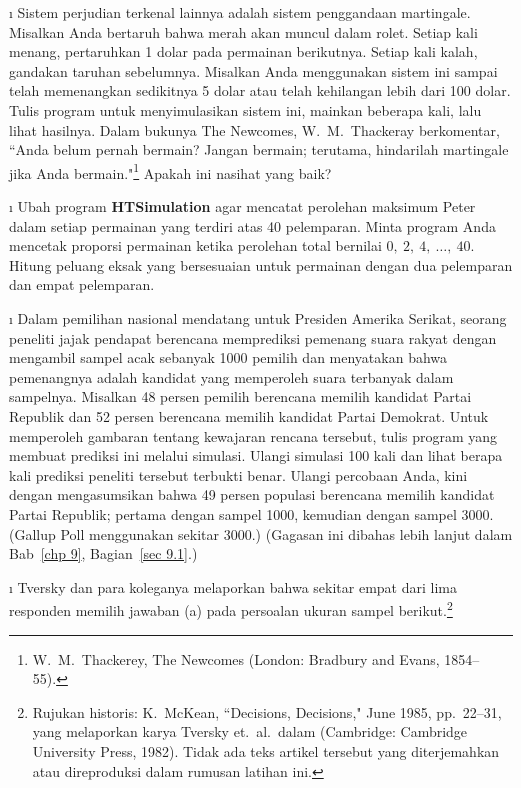 \begin{LJSItem}
\i\label{exer 1.1.10} Sistem perjudian terkenal lainnya adalah \emx
{sistem penggandaan martingale}.  
Misalkan Anda bertaruh bahwa merah akan muncul
dalam rolet.  Setiap kali menang, pertaruhkan 1 dolar pada permainan berikutnya.  Setiap kali
kalah,
gandakan taruhan sebelumnya.  Misalkan Anda menggunakan sistem ini sampai telah memenangkan sedikitnya 5
dolar atau telah kehilangan lebih dari 100 dolar.  Tulis program untuk menyimulasikan
sistem ini, mainkan beberapa kali, lalu lihat hasilnya.  Dalam bukunya
\emx
{The Newcomes,} W.~M.~Thackeray berkomentar, 
``Anda belum pernah bermain?  Jangan
bermain; terutama, hindarilah martingale jika Anda bermain."\footnote{W.~M.~Thackerey, \emx
{The
Newcomes} (London: Bradbury and Evans, 1854--55).}  Apakah ini nasihat yang baik?

\i\label{exer 1.1.11} Ubah program {\bf HTSimulation} agar
mencatat
perolehan maksimum Peter dalam setiap permainan yang terdiri atas 40 pelemparan.  Minta program Anda
mencetak
proporsi permainan ketika perolehan total bernilai $0,\ 2,\ 
4,\ \dots,\ 40$.  Hitung peluang eksak yang bersesuaian untuk permainan dengan
dua
pelemparan dan empat pelemparan.

\i\label{exer 1.1.12} 
Dalam pemilihan nasional mendatang untuk Presiden Amerika Serikat, seorang
peneliti jajak pendapat berencana memprediksi pemenang suara rakyat dengan mengambil
sampel acak
sebanyak 1000 pemilih dan menyatakan bahwa pemenangnya adalah kandidat yang memperoleh
suara terbanyak
dalam sampelnya. Misalkan 48 persen pemilih berencana memilih
kandidat
Partai Republik dan 52 persen berencana memilih kandidat Partai
Demokrat.  
Untuk memperoleh gambaran tentang kewajaran rencana tersebut, tulis program yang membuat
prediksi ini
melalui simulasi.  Ulangi simulasi 100 kali dan lihat berapa kali prediksi peneliti tersebut
terbukti benar.  Ulangi percobaan Anda, kini dengan mengasumsikan bahwa 49 persen
populasi berencana memilih kandidat Partai Republik; pertama dengan sampel 1000, kemudian
dengan sampel 3000.  (Gallup\index{Gallup Poll} Poll menggunakan sekitar 3000.)  (Gagasan ini
dibahas lebih lanjut dalam Bab~\ref{chp 9}, Bagian~\ref{sec 9.1}.)

\i\label{exer 1.1.13} Tversky dan para koleganya melaporkan
bahwa sekitar empat dari lima responden memilih jawaban (a) pada persoalan ukuran
sampel berikut.\footnote{Rujukan historis: K.~McKean, ``Decisions, Decisions,"
\emx {Discover,} June 1985, pp.~22--31, yang melaporkan karya Tversky et.\ al.\
dalam  (Cambridge:
Cambridge University Press, 1982). Tidak ada teks artikel tersebut yang
diterjemahkan atau direproduksi dalam rumusan latihan ini.}


\end{LJSItem}
